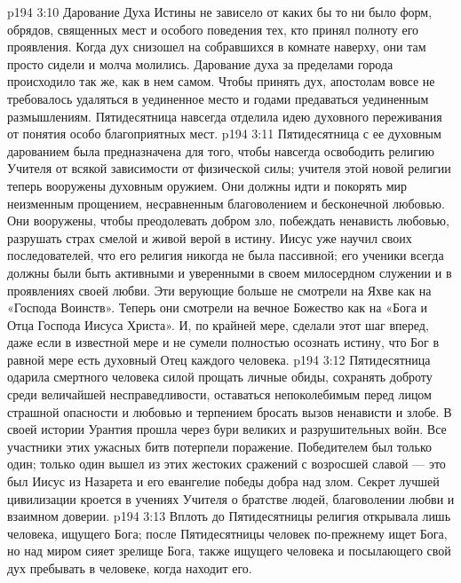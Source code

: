 \vs p194 3:10 Дарование Духа Истины не зависело от каких бы то ни было форм, обрядов, священных мест и особого поведения тех, кто принял полноту его проявления. Когда дух снизошел на собравшихся в комнате наверху, они там просто сидели и молча молились. Дарование духа за пределами города происходило так же, как в нем самом. Чтобы принять дух, апостолам вовсе не требовалось удаляться в уединенное место и годами предаваться уединенным размышлениям. Пятидесятница навсегда отделила идею духовного переживания от понятия особо благоприятных мест.
\vs p194 3:11 \pc Пятидесятница с ее духовным дарованием была предназначена для того, чтобы навсегда освободить религию Учителя от всякой зависимости от физической силы; учителя этой новой религии теперь вооружены духовным оружием. Они должны идти и покорять мир неизменным прощением, несравненным благоволением и бесконечной любовью. Они вооружены, чтобы преодолевать добром зло, побеждать ненависть любовью, разрушать страх смелой и живой верой в истину. Иисус уже научил своих последователей, что его религия никогда не была пассивной; его ученики всегда должны были быть активными и уверенными в своем милосердном служении и в проявлениях своей любви. Эти верующие больше не смотрели на Яхве как на «Господа Воинств». Теперь они смотрели на вечное Божество как на «Бога и Отца Господа Иисуса Христа». И, по крайней мере, сделали этот шаг вперед, даже если в известной мере и не сумели полностью осознать истину, что Бог в равной мере есть духовный Отец каждого человека.
\vs p194 3:12 Пятидесятница одарила смертного человека силой прощать личные обиды, сохранять доброту среди величайшей несправедливости, оставаться непоколебимым перед лицом страшной опасности и любовью и терпением бросать вызов ненависти и злобе. В своей истории Урантия прошла через бури великих и разрушительных войн. Все участники этих ужасных битв потерпели поражение. Победителем был только один; только один вышел из этих жестоких сражений с возросшей славой --- это был Иисус из Назарета и его евангелие победы добра над злом. Секрет лучшей цивилизации кроется в учениях Учителя о братстве людей, благоволении любви и взаимном доверии.
\vs p194 3:13 Вплоть до Пятидесятницы религия открывала лишь человека, ищущего Бога; после Пятидесятницы человек по\hyp{}прежнему ищет Бога, но над миром сияет зрелище Бога, также ищущего человека и посылающего свой дух пребывать в человеке, когда находит его.
